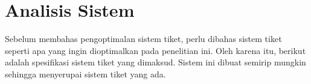\section{Analisis Sistem}
\label{apx:analisis-kebutuhan}

Sebelum membahas pengoptimalan sistem tiket, perlu dibahas sistem tiket seperti apa yang ingin dioptimalkan pada penelitian ini. Oleh karena itu, berikut adalah spesifikasi sistem tiket yang dimaksud. Sistem ini dibuat semirip mungkin sehingga menyerupai sistem tiket yang ada.





